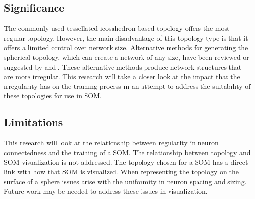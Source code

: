 \documentclass[10pt,titlepage]{article}
\begin{document}
\subsection{Significance}
The commonly used tessellated icosahedron based topology offers the most
regular topology.   However, the main disadvantage of this topology type is that it
offers a limited control over network size.  Alternative methods for generating
the spherical topology, which can create a network of any size, have been
reviewed or suggested by \cite{wu2005} and \cite{Nishio:2006fk}.  These
alternative methods produce network structures that are more irregular.  This
research will take a closer look at the impact that the irregularity has on the
training process in an attempt to address the suitability of these topologies
for use in SOM.

\subsection{Limitations}
This research will look at the relationship between regularity in neuron connectedness
and the training of a SOM. The relationship between topology and SOM visualization is not
addressed. The topology chosen for a SOM has a direct link with how that SOM is
visualized.  When representing the topology on the surface of a sphere issues
arise with the uniformity in neuron spacing and sizing.  Future work may be
needed to address these issues in visualization.




\end{document}
